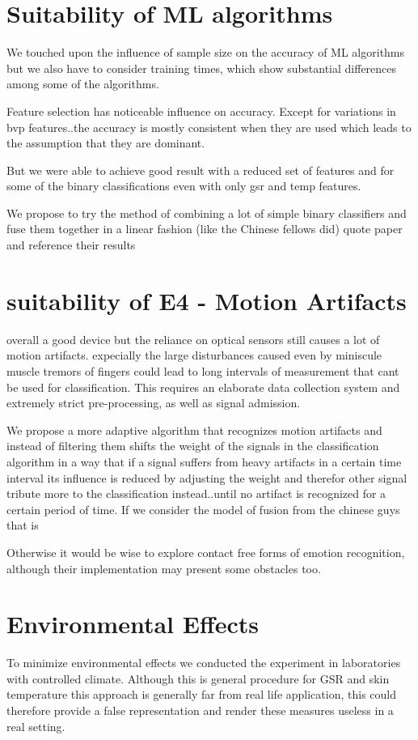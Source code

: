 \section{Suitability of ML algorithms}
We touched upon the influence of sample size on the accuracy of ML algorithms but we also have to consider training times, which show substantial differences among some of the algorithms.

Feature selection has noticeable influence on accuracy. Except for variations in bvp features..the accuracy is mostly consistent when they are used which leads to the assumption that they are dominant.

But we were able to achieve good result with a reduced set of features and for some of the binary classifications even with only gsr and temp features.

We propose to try the method of combining a lot of simple binary classifiers and fuse them together in a linear fashion (like the Chinese fellows did) quote paper and reference their results

\section{suitability of E4 - Motion Artifacts}
overall a good device but the reliance on optical sensors still causes a lot of motion artifacts. expecially the large disturbances caused even by miniscule muscle tremors of fingers could lead to long intervals of measurement that cant be used for classification. This requires an elaborate data collection system and extremely strict pre-processing, as well as signal admission.

We propose a more adaptive algorithm that recognizes motion artifacts and instead of filtering them shifts the weight of the signals in the classification algorithm in a way that if a signal suffers from heavy artifacts in a certain time interval its influence is reduced by adjusting the weight and therefor other signal tribute more to the classification instead..until no artifact is recognized for a certain period of time. If we consider the model of fusion from the chinese guys that is

Otherwise it would be wise to explore contact free forms of emotion recognition, although their implementation may present some obstacles too.

\section{Environmental Effects}
To minimize environmental effects we conducted the experiment in laboratories with controlled climate. Although this is general procedure for GSR and skin temperature this approach is generally far from real life application, this could therefore provide a false representation and render these measures useless in a real setting.

